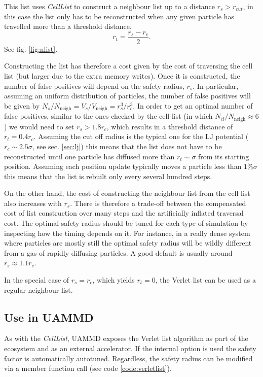 \documentclass[ twoside,openright,titlepage,numbers=noenddot,%
headinclude,footinclude,cleardoublepage=empty,abstract=on,
BCOR=5mm,paper=a4,fontsize=11pt, dvipsnames
]{scrreprt}
\newcommand{\uammd}{\gls{UAMMD}\xspace}
\begin{document}
This list uses \emph{CellList} to construct a neighbour list up to a distance $r_{s} > r_{cut}$, in this case the list only has to be reconstructed when any given particle has travelled more than a threshold distance,
\begin{equation}
r_t = \frac{r_{s}-r_{c}}{2}.
\end{equation}
See fig. \ref{fig:nlist}.

Constructing the list has therefore a cost given by the cost of traversing the cell list (but larger due to the extra memory writes). Once it is constructed, the number of false positives will depend on the safety radius, $r_s$. In particular, assuming an uniform distribution of particles, the number of false positives will be given by $N_s/N_{\text{neigh}} = V_s/V_{\text{neigh}} = r_s^3/r_c^3$. In order to get an optimal number of false positives, similar to the ones checked by the cell list (in which $N_{cl}/N_{\text{neigh}} \approx 6$) we would need to set $r_s > 1.8r_c$, which results in a threshold distance of $r_t = 0.4r_c$. Assuming the cut off radius is the typical one for the \gls{LJ} potential ($r_c \sim 2.5\sigma$, see sec. \ref{sec:lj}) this means that the list does not have to be reconstructed until one particle has diffused more than $r_t \sim \sigma$ from its starting position. Assuming each position update typically moves a particle less than $1\%\sigma$ this means that the list is rebuilt only every several hundred steps.

On the other hand, the cost of constructing the neighbour list from the cell list also increases with $r_s$. There is therefore a trade-off between the compensated cost of list construction over many steps and the artificially inflated traversal cost. The optimal safety radius should be tuned for each type of simulation by inspecting how the timing depends on it. For instance, in a really dense system where particles are mostly still the optimal safety radius will be wildly different from a gas of rapidly diffusing particles. A good default is usually around $r_s\approx 1.1r_c$. 

In the special case of $r_s=r_c$, which yields $r_t = 0$, the Verlet list can be used as a regular neighbour list.

\subsection*{Use in UAMMD}

As with the \emph{CellList}, \uammd exposes the Verlet list algorithm as part of the ecosystem and as an external accelerator. If the internal option is used the safety factor is automatically autotuned. Regardless, the safety radius can be modified via a member function call (see code \ref{code:verletlist}).
\end{document}
